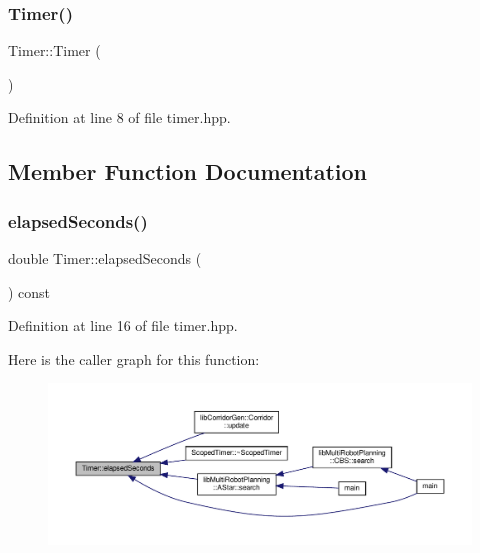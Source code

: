 \subsubsection{\texorpdfstring{Timer()}{Timer()}}
{\footnotesize\ttfamily Timer\+::\+Timer (\begin{DoxyParamCaption}{ }\end{DoxyParamCaption})\hspace{0.3cm}{\ttfamily [inline]}}



Definition at line 8 of file timer.\+hpp.



\subsection{Member Function Documentation}
\mbox{\label{class_timer_ab98eee549aa6c69eb83de41ed555d1e0}} 
\subsubsection{\texorpdfstring{elapsed\+Seconds()}{elapsedSeconds()}}
{\footnotesize\ttfamily double Timer\+::elapsed\+Seconds (\begin{DoxyParamCaption}{ }\end{DoxyParamCaption}) const\hspace{0.3cm}{\ttfamily [inline]}}



Definition at line 16 of file timer.\+hpp.

Here is the caller graph for this function\+:
\nopagebreak
\begin{figure}[H]
\begin{center}
\leavevmode
\includegraphics[width=350pt]{class_timer_ab98eee549aa6c69eb83de41ed555d1e0_icgraph}
\end{center}
\end{figure}
\mbox{\label{class_timer_a9020542d73357a4eef512eefaf57524b}} 
